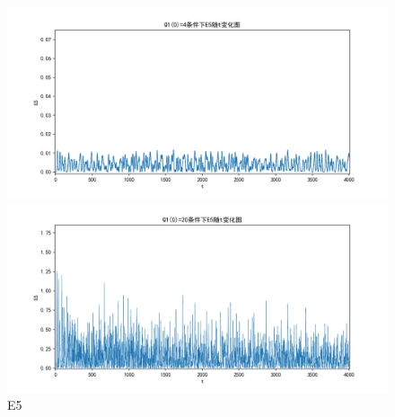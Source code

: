 \documentclass[10pt, a4paper]{article}
\begin{document}
    \begin{figure}[H]
        \begin{minipage}[t]{0.49\textwidth}
            \centering
            \includegraphics[width=\textwidth]{./q5_pics/cmp/E5.png}
        \end{minipage}
        \begin{minipage}[t]{0.49\textwidth}
            \centering
            \includegraphics[width=\textwidth]{./q5_pics/exp/E5.png}
        \end{minipage}
        \caption{E5}\label{fig:E5 in q5}
    \end{figure}
\end{document}
